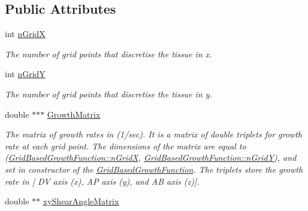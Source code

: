 \subsection*{Public Attributes}
\begin{DoxyCompactItemize}
\item 
\hypertarget{classGridBasedGrowthFunction_af872b9963f3a579dcd615c23bcb58a86}{}int \hyperlink{classGridBasedGrowthFunction_af872b9963f3a579dcd615c23bcb58a86}{n\+Grid\+X}\label{classGridBasedGrowthFunction_af872b9963f3a579dcd615c23bcb58a86}

\begin{DoxyCompactList}\small\item\em The number of grid points that discretise the tissue in x. \end{DoxyCompactList}\item 
\hypertarget{classGridBasedGrowthFunction_a625bc963a1f1e7d1f1a35dbd0ef51728}{}int \hyperlink{classGridBasedGrowthFunction_a625bc963a1f1e7d1f1a35dbd0ef51728}{n\+Grid\+Y}\label{classGridBasedGrowthFunction_a625bc963a1f1e7d1f1a35dbd0ef51728}

\begin{DoxyCompactList}\small\item\em The number of grid points that discretise the tissue in y. \end{DoxyCompactList}\item 
\hypertarget{classGridBasedGrowthFunction_a5522d9b84fa95ebd65cdf290a4f0a65c}{}double $\ast$$\ast$$\ast$ \hyperlink{classGridBasedGrowthFunction_a5522d9b84fa95ebd65cdf290a4f0a65c}{Growth\+Matrix}\label{classGridBasedGrowthFunction_a5522d9b84fa95ebd65cdf290a4f0a65c}

\begin{DoxyCompactList}\small\item\em The matrix of growth rates in (1/sec). It is a matrix of double triplets for growth rate at each grid point. The dimensions of the matrix are equal to (\hyperlink{classGridBasedGrowthFunction_af872b9963f3a579dcd615c23bcb58a86}{Grid\+Based\+Growth\+Function\+::n\+Grid\+X}, \hyperlink{classGridBasedGrowthFunction_a625bc963a1f1e7d1f1a35dbd0ef51728}{Grid\+Based\+Growth\+Function\+::n\+Grid\+Y}), and set in constructor of the \hyperlink{classGridBasedGrowthFunction}{Grid\+Based\+Growth\+Function}. The triplets store the growth rate in \mbox{[} D\+V axis (x), A\+P axis (y), and A\+B axis (z)\mbox{]}. \end{DoxyCompactList}\item 
\hypertarget{classGridBasedGrowthFunction_aa01cee8282299e18f27b47645da17438}{}double $\ast$$\ast$ \hyperlink{classGridBasedGrowthFunction_aa01cee8282299e18f27b47645da17438}{xy\+Shear\+Angle\+Matrix}\label{classGridBasedGrowthFunction_aa01cee8282299e18f27b47645da17438}


\end{DoxyCompactItemize}
